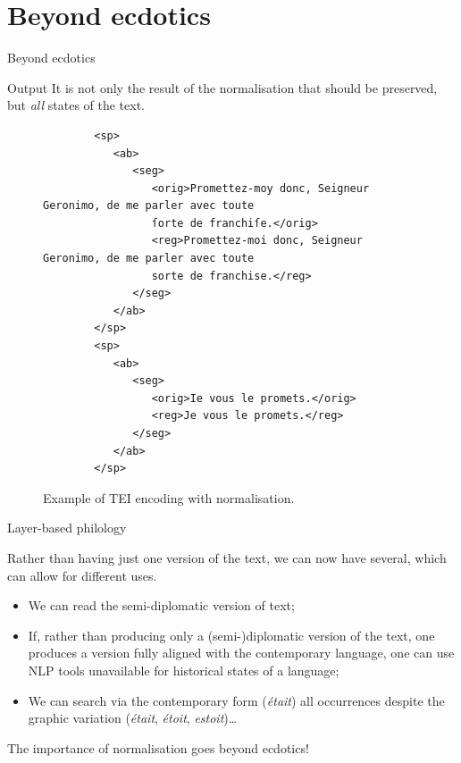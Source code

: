 \documentclass[aspectratio=169]{beamer}
\begin{document}

    \section{Beyond ecdotics}

    \begin{frame}
	\begin{center}
            Beyond ecdotics
	\end{center}
    \end{frame}


    \begin{frame}[fragile]{Output}
        \vspace{2em}
        {It is not only the result of the normalisation that should be preserved, but \textit{all} states of the text.}
        \begin{figure}
        \begin{verbatim}
        <sp>
           <ab>
              <seg>
                 <orig>Promettez-moy donc, Seigneur Geronimo, de me parler avec toute
                 ſorte de franchiſe.</orig>
                 <reg>Promettez-moi donc, Seigneur Geronimo, de me parler avec toute
                 sorte de franchise.</reg>
              </seg>
           </ab>
        </sp>
        <sp>
           <ab>
              <seg>
                 <orig>Ie vous le promets.</orig>
                 <reg>Je vous le promets.</reg>
              </seg>
           </ab>
        </sp>
        \end{verbatim}
            \caption{Example of TEI encoding with normalisation.}
            \label{fig:tei}
        \end{figure}
    \end{frame}


    \begin{frame}{Layer-based philology}
    
        Rather than having just one version of the text, we can now have several, which can allow for different uses.
        \begin{itemize}
            \item We can read the semi-diplomatic version of text;
            \item If, rather than producing only a (semi-)diplomatic version of the text, one produces a version fully aligned with the contemporary language, one can use NLP tools unavailable for historical states of a language;
            \item We can search via the contemporary form (\textit{était}) all occurrences despite the graphic variation (\textit{était}, \textit{étoit}, \textit{estoit})…
        \end{itemize}

        The importance of normalisation goes beyond ecdotics!
        
    \end{frame}
\end{document}
